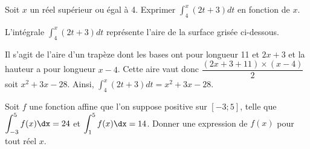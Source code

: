 \documentclass[11pt,fleqn, openany]{book} %
\begin{document}
\begin{exercise}Soit $x$ un réel supérieur ou égal à 4. Exprimer $\displaystyle\int_{4}^{x} (2t+3)dt$ en fonction de $x$.\end{exercise}

\begin{solution}

L'intégrale \(\displaystyle\int_{4}^{x} (2t+3)dt\) représente l'aire de la surface grisée ci-dessous.

\begin{center}
\end{center}


Il s'agit de l'aire d'un trapèze dont les bases ont pour longueur 11 et \(2x+3\) et la hauteur a pour longueur \(x-4\). Cette aire vaut donc \(\dfrac{(2x+3+11)\times (x-4)}{2}\) soit \(x^2+3x-28\). Ainsi,  \(\displaystyle\int_{4}^{x} (2t+3)dt=x^2+3x-28\).

\end{solution}



\begin{exercise}Soit $f$ une fonction affine que l'on suppose positive sur $[-3;5]$, telle que $\displaystyle\int_{-3}^5 f(x)\dx=24$ et $\displaystyle\int_{1}^5 f(x)\dx=14$. Donner une expression de $f(x)$ pour tout réel $x$.\end{exercise}
\end{document}
